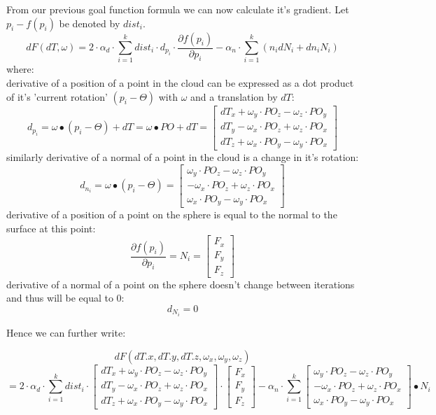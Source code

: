 \documentclass{book}
\begin{document}
From our previous goal function formula we can now calculate it's gradient. Let $p_i-f(p_i)$ be denoted by $dist_i$.
$$dF(dT, \omega) = 2\cdot \alpha_d \cdot \sum_{i=1}^{k}dist_i \cdot d_{p_i} \cdot \frac{\partial f(p_i)}{\partial p_i} - \alpha_n \cdot \sum_{i=1}^{k}(n_idN_i + dn_iN_i)$$
where: 
\\derivative of a position of a point in the cloud can be expressed as a dot product of it's 'current rotation' $(p_i - \Theta)$ with $\omega$ and a translation by $dT$:
$$d_{p_i} = \omega \bullet (p_i - \Theta) + dT = \omega \bullet PO + dT =
\begin{bmatrix}
	dT_x + \omega_y\cdot PO_z - \omega_z\cdot PO_y\\
	dT_y - \omega_x\cdot PO_z + \omega_z\cdot PO_x\\
	dT_z + \omega_x\cdot PO_y - \omega_y\cdot PO_x
\end{bmatrix}$$
similarly derivative of a normal of a point in the cloud is a change in it's rotation:
$$d_{n_i} = \omega \bullet (p_i - \Theta) = 
\begin{bmatrix}
	\omega_y\cdot PO_z - \omega_z\cdot PO_y\\
	- \omega_x\cdot PO_z + \omega_z\cdot PO_x\\
	\omega_x\cdot PO_y - \omega_y\cdot PO_x
\end{bmatrix}$$
derivative of a position of a point on the sphere is equal to the normal to the surface at this point:
$$\frac{\partial f(p_i)}{\partial p_i} = N_i =
\begin{bmatrix}
	F_x\\
	F_y\\
	F_z
\end{bmatrix}$$
derivative of a normal of a point on the sphere doesn't change between iterations and thus will be equal to 0:
$$d_{N_i} = 0$$

Hence we can further write:

$$dF(dT.x, dT.y, dT.z, \omega_x, \omega_y, \omega_z)$$
$$ = 2\cdot \alpha_d \cdot \sum_{i=1}^{k}dist_i \cdot 
\begin{bmatrix}
	dT_x + \omega_y\cdot PO_z - \omega_z\cdot PO_y\\
	dT_y - \omega_x\cdot PO_z + \omega_z\cdot PO_x\\
	dT_z + \omega_x\cdot PO_y - \omega_y\cdot PO_x
\end{bmatrix}
\cdot 
\begin{bmatrix}
	F_x\\
	F_y\\
	F_z
\end{bmatrix}
-\alpha_n \cdot \sum_{i=1}^{k}
\begin{bmatrix}
	\omega_y\cdot PO_z - \omega_z\cdot PO_y\\
	- \omega_x\cdot PO_z + \omega_z\cdot PO_x\\
	\omega_x\cdot PO_y - \omega_y\cdot PO_x
\end{bmatrix} \bullet N_i$$


\begin{thebibliography}{1}
    
    
\end{thebibliography}
\end{document}
